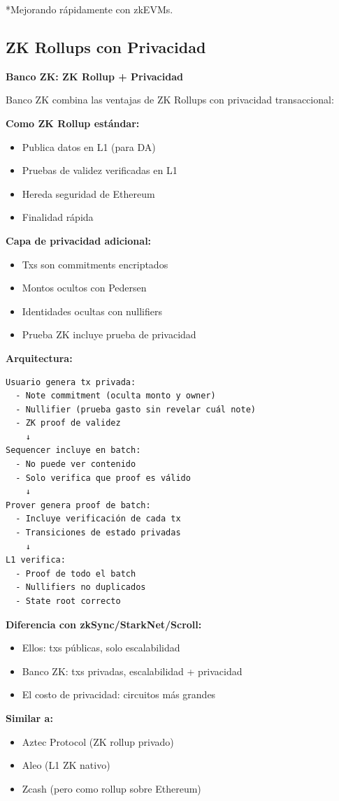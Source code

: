 \documentclass[11pt,a4paper,twoside,openright]{book}
\theoremstyle{definition}
\theoremstyle{plain}
\theoremstyle{remark}
\begin{document}
*Mejorando rápidamente con zkEVMs.

\subsection{ZK Rollups con Privacidad}

\begin{bancozk}
\textbf{Banco ZK: ZK Rollup + Privacidad}

Banco ZK combina las ventajas de ZK Rollups con privacidad transaccional:

\textbf{Como ZK Rollup estándar:}
\begin{itemize}
    \item Publica datos en L1 (para DA)
    \item Pruebas de validez verificadas en L1
    \item Hereda seguridad de Ethereum
    \item Finalidad rápida
\end{itemize}

\textbf{Capa de privacidad adicional:}
\begin{itemize}
    \item Txs son commitments encriptados
    \item Montos ocultos con Pedersen
    \item Identidades ocultas con nullifiers
    \item Prueba ZK incluye prueba de privacidad
\end{itemize}

\textbf{Arquitectura:}
\begin{verbatim}
Usuario genera tx privada:
  - Note commitment (oculta monto y owner)
  - Nullifier (prueba gasto sin revelar cuál note)
  - ZK proof de validez
    ↓
Sequencer incluye en batch:
  - No puede ver contenido
  - Solo verifica que proof es válido
    ↓
Prover genera proof de batch:
  - Incluye verificación de cada tx
  - Transiciones de estado privadas
    ↓
L1 verifica:
  - Proof de todo el batch
  - Nullifiers no duplicados
  - State root correcto
\end{verbatim}

\textbf{Diferencia con zkSync/StarkNet/Scroll:}
\begin{itemize}
    \item Ellos: txs públicas, solo escalabilidad
    \item Banco ZK: txs privadas, escalabilidad + privacidad
    \item El costo de privacidad: circuitos más grandes
\end{itemize}

\textbf{Similar a:}
\begin{itemize}
    \item Aztec Protocol (ZK rollup privado)
    \item Aleo (L1 ZK nativo)
    \item Zcash (pero como rollup sobre Ethereum)
\end{itemize}
\end{bancozk}
\end{document}
